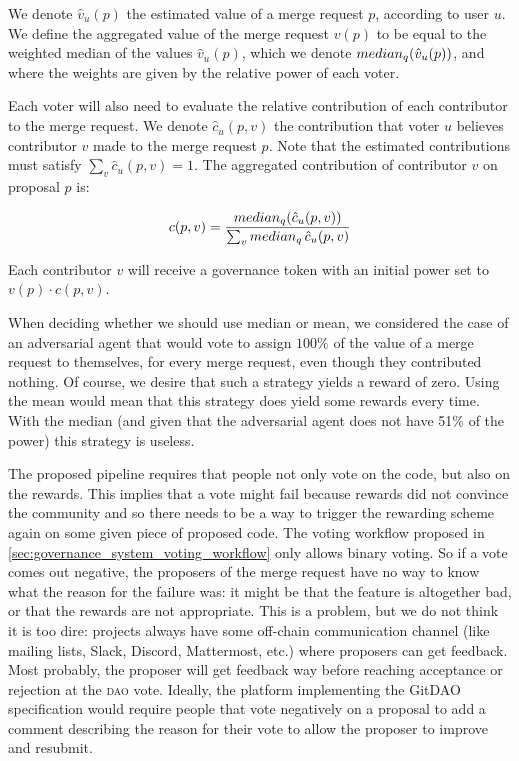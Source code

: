 We denote $\hat v_u(p)$ the estimated value of a merge request $p$, according to user $u$.
We define the aggregated value of the merge request $v(p)$ to be equal to the weighted median of the values $\hat v_u(p)$, which we denote $\operatorname{{\mathnormal{median_q}}}(\hat v_u(p))$, and where the weights are given by the relative power of each voter.

Each voter will also need to evaluate the relative contribution of each contributor to the merge request.
We denote $\hat c_u(p, v)$ the contribution that voter $u$ believes contributor $v$ made to the merge request $p$.
Note that the estimated contributions must satisfy $\sum_v \hat c_u(p, v) = 1$.
The aggregated contribution of contributor $v$ on proposal $p$ is:

\[
	c(p, v) = \frac{\operatorname{{\mathnormal{median_q}}}(\hat c_u(p, v))}{\sum_v \operatorname{{\mathnormal{median_q}}}{\hat c_u(p, v)}}
\]

Each contributor $v$ will receive a governance token with an initial power set to $v(p) \cdot c(p, v)$.

When deciding whether we should use median or mean, we considered the case of an adversarial agent that would vote to assign $100\%$ of the value of a merge request to themselves, for every merge request, even though they contributed nothing.
Of course, we desire that such a strategy yields a reward of zero.
Using the mean would mean that this strategy does yield some rewards every time.
With the median (and given that the adversarial agent does not have 51\% of the power) this strategy is useless.

The proposed pipeline requires that people not only vote on the code, but also on the rewards.
This implies that a vote might fail because rewards did not convince the community and so there needs to be a way to trigger the rewarding scheme again on some given piece of proposed code.
The voting workflow proposed in \cref{sec:governance_system_voting_workflow} only allows binary voting.
So if a vote comes out negative, the proposers of the merge request have no way to know what the reason for the failure was: it might be that the feature is altogether bad, or that the rewards are not appropriate.
This is a problem, but we do not think it is too dire: projects always have some off-chain communication channel (like mailing lists, Slack, Discord, Mattermost, etc.) where proposers can get feedback.
Most probably, the proposer will get feedback way before reaching acceptance or rejection at the \textsc{dao} vote.
Ideally, the platform implementing the GitDAO specification would require people that vote negatively on a proposal to add a comment describing the reason for their vote to allow the proposer to improve and resubmit.

